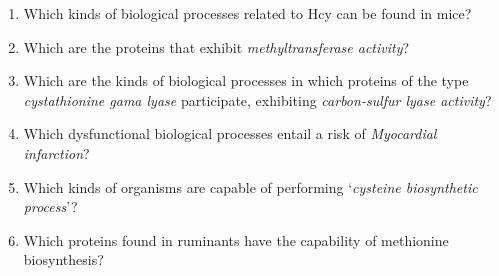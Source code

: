 \begin{enumerate}
	\item Which kinds of biological processes related to Hcy can be found in mice?
	\item Which are the proteins that exhibit  \textit{methyltransferase activity}? 
	\item Which are the kinds of biological processes in which proteins of the type \textit{cystathionine gama lyase} participate, exhibiting \textit{carbon-sulfur lyase activity}?
	\item Which dysfunctional biological processes entail a risk of \textit{Myocardial infarction}?
	\item Which kinds of organisms are capable of performing `\textit{cysteine biosynthetic process}'?
	\item Which proteins found in ruminants have the capability of methionine biosynthesis? 
\end{enumerate}

